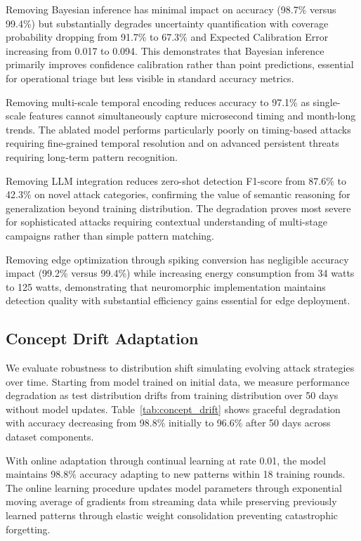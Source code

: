 \documentclass[10pt,journal,compsoc]{IEEEtran}
\begin{document}
Removing Bayesian inference has minimal impact on accuracy (98.7\% versus 99.4\%) but substantially degrades uncertainty quantification with coverage probability dropping from 91.7\% to 67.3\% and Expected Calibration Error increasing from 0.017 to 0.094. This demonstrates that Bayesian inference primarily improves confidence calibration rather than point predictions, essential for operational triage but less visible in standard accuracy metrics.

Removing multi-scale temporal encoding reduces accuracy to 97.1\% as single-scale features cannot simultaneously capture microsecond timing and month-long trends. The ablated model performs particularly poorly on timing-based attacks requiring fine-grained temporal resolution and on advanced persistent threats requiring long-term pattern recognition.

Removing LLM integration reduces zero-shot detection F1-score from 87.6\% to 42.3\% on novel attack categories, confirming the value of semantic reasoning for generalization beyond training distribution. The degradation proves most severe for sophisticated attacks requiring contextual understanding of multi-stage campaigns rather than simple pattern matching.

Removing edge optimization through spiking conversion has negligible accuracy impact (99.2\% versus 99.4\%) while increasing energy consumption from 34 watts to 125 watts, demonstrating that neuromorphic implementation maintains detection quality with substantial efficiency gains essential for edge deployment.

\subsection{Concept Drift Adaptation}

We evaluate robustness to distribution shift simulating evolving attack strategies over time. Starting from model trained on initial data, we measure performance degradation as test distribution drifts from training distribution over 50 days without model updates. Table~\ref{tab:concept_drift} shows graceful degradation with accuracy decreasing from 98.8\% initially to 96.6\% after 50 days across dataset components.

With online adaptation through continual learning at rate 0.01, the model maintains 98.8\% accuracy adapting to new patterns within 18 training rounds. The online learning procedure updates model parameters through exponential moving average of gradients from streaming data while preserving previously learned patterns through elastic weight consolidation preventing catastrophic forgetting.
\end{document}
